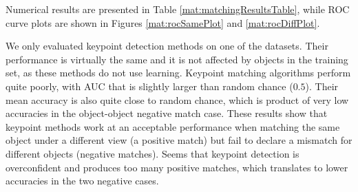 Numerical results are presented in Table \ref{mat:matchingResultsTable}, while ROC curve plots are shown in Figures \ref{mat:rocSamePlot} and \ref{mat:rocDiffPlot}.

We only evaluated keypoint detection methods on one of the datasets. Their performance is virtually the same and it is not affected by objects in the training set, as these methods do not use learning. Keypoint matching algorithms perform quite poorly, with AUC that is slightly larger than random chance ($0.5$). Their mean accuracy is also quite close to random chance, which is product of very low accuracies in the object-object negative match case. These results show that keypoint methods work at an acceptable performance when matching the same object under a different view (a positive match) but fail to declare a mismatch for different objects (negative matches). Seems that keypoint detection is overconfident and produces too many positive matches, which translates to lower accuracies in the two negative cases.

